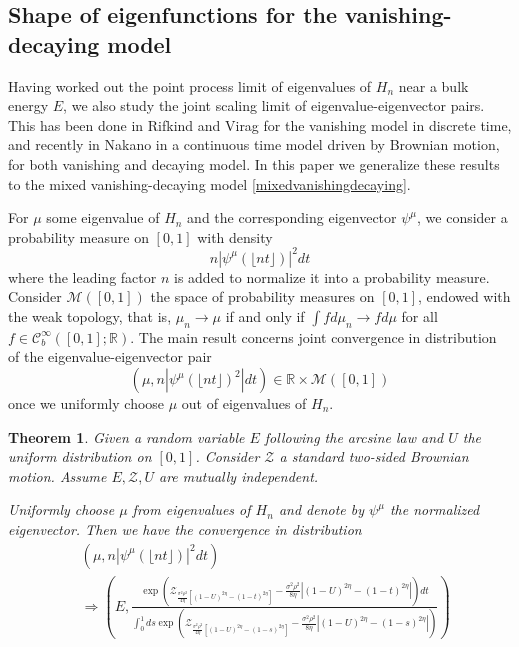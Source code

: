 \documentclass[12pt, reqno]{amsart}
\newtheorem{theorem}{Theorem}[section]
\theoremstyle{definition}
\theoremstyle{remark}
\numberwithin{equation}{section}
\begin{document}
\subsection{Shape of eigenfunctions for the vanishing-decaying model}


Having worked out the point process limit of eigenvalues of $H_n$ near a bulk energy $E$, we also study the joint scaling limit of eigenvalue-eigenvector pairs. This has been done in Rifkind and Virag \cite{rifkind2018eigenvectors} for the vanishing model in discrete time, and recently in Nakano \cite{nakano2022shape} in a continuous time model driven by Brownian motion, for both vanishing and decaying model. In this paper we generalize these results to the mixed vanishing-decaying model \eqref{mixedvanishingdecaying}.

For $\mu$ some eigenvalue of $H_n$ and the corresponding eigenvector $\psi^\mu$, we consider a probability measure on $[0,1]$ with density 
$$n|\psi^\mu(\lfloor nt\rfloor)|^2dt$$
where the leading factor $n$ is added to normalize it into a probability measure. Consider $\mathcal{M}([0,1])$ the space of probability measures on $[0,1]$, endowed with the weak topology, that is, $\mu_n\to\mu$ if and only if $\int fd\mu_n\to fd\mu$ for all $f\in\mathcal{C}_b^\infty([0,1];\mathbb{R})$.
The main result concerns joint convergence in distribution of the eigenvalue-eigenvector pair
$$(\mu,n|\psi^\mu(\lfloor nt\rfloor)^2|dt)\in\mathbb{R}\times\mathcal{M}([0,1])$$
once we uniformly choose $\mu$ out of eigenvalues of $H_n$.

\begin{theorem}\label{shapetheorem}
    Given a random variable $E$ following the arcsine law and $U$ the uniform distribution on $[0,1]$. Consider $\mathcal{Z}$ a standard two-sided Brownian motion. Assume $E,\mathcal{Z},U$ are mutually independent. 

    Uniformly choose $\mu$ from eigenvalues of $H_n$ and denote by $\psi^\mu$ the normalized eigenvector. Then we have the convergence in distribution
    $$\begin{aligned} &\left(\mu,n|\psi^\mu(\lfloor nt\rfloor)|^2 dt\right)\\
    &\Rightarrow \left(E,
\frac{\exp\left(\mathcal{Z}_{\frac{\sigma^2\rho^2}{4\eta}[(1-U)^{2\eta}-(1-t)^{2\eta}]}-\frac{\sigma^2\rho^2}{8\eta}\left|(1-U)^{2\eta}-(1-t)^{2\eta}\right|\right)dt}{\int_0^1 ds \exp\left(\mathcal{Z}_{\frac{\sigma^2\rho^2}{4\eta}[(1-U)^{2\eta}-(1-s)^{2\eta}]}-\frac{\sigma^2\rho^2}{8\eta}\left|(1-U)^{2\eta}-(1-s)^{2\eta}\right|\right)}
\right)
 \end{aligned}   $$
\end{theorem}
\end{document}
